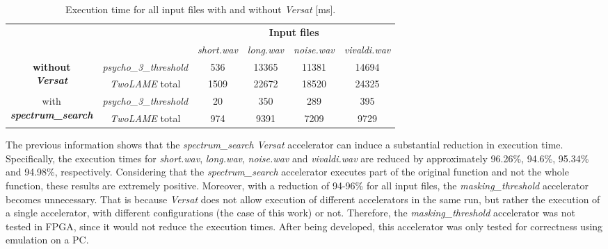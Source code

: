 \begin{table}[H]
    \centering
    \begin{tabular}{|c|c|c|c|c|c|}
    \cline{3-6}
    \multicolumn{2}{c|}{}  & \multicolumn{4}{c|}{\textbf{Input files}} \\
    \cline{3-6}
    \multicolumn{2}{c|}{} & \textit{short.wav} & \textit{long.wav} & \textit{noise.wav} & \textit{vivaldi.wav} \\
    \hline
   \multirow{2}{*}{\parbox{2.5cm}{\centering \textbf{without} \\ \textbf{\textit{Versat}}}}  & \multicolumn{1}{c|}{\textit{psycho\_3\_threshold}}  & 536 & 13365 & 11381 & 14694 \\ 
    \cline{2-6}
    & \multicolumn{1}{|c|}{\textit{TwoLAME} total}  & 1509 & 22672 & 18520 & 24325\\ 
    \hline
    \multirow{2}{*}{\parbox{3.2cm}{\centering with \\ \textbf{\textit{spectrum\_search}}}}  & \multicolumn{1}{c|}{\textit{psycho\_3\_threshold}}  & 20 & 350 & 289 & 395 \\ 
    \cline{2-6}
    & \multicolumn{1}{|c|}{\textit{TwoLAME} total}  & 974 & 9391 & 7209 & 9729 \\ 
    \hline
    \end{tabular}
    \caption{Execution time for all input files with and without \textit{Versat} [ms].}
    \label{time}
\end{table}

The previous information shows that the \textit{spectrum\_search} \textit{Versat} accelerator can induce a substantial reduction in execution time. Specifically, the execution times for \textit{short.wav}, \textit{long.wav}, \textit{noise.wav} and \textit{vivaldi.wav} are reduced by approximately 96.26\%, 94.6\%, 95.34\% and 94.98\%, respectively.
Considering that the \textit{spectrum\_search} accelerator executes part of the original function and not the whole function, these results are extremely positive. Moreover, with a reduction of 94-96\% for all input files, the \textit{masking\_threshold} accelerator becomes unnecessary. That is because \textit{Versat} does not allow execution of different accelerators in the same run, but rather the execution of a single accelerator, with different configurations (the case of this work) or not.
Therefore, the \textit{masking\_threshold} accelerator was not tested in FPGA, since it would not reduce the execution times. After being developed, this accelerator was only tested for correctness using emulation on a PC.


